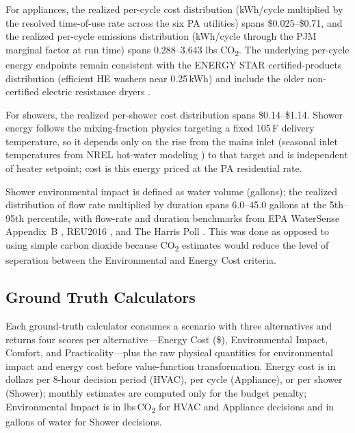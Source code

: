 \documentclass[final,3p,times]{elsarticle}
\begin{document}
For appliances, the realized per-cycle cost distribution (kWh/cycle multiplied by the resolved time-of-use rate across the six PA utilities) spans \$0.025--\$0.71, and the realized per-cycle emissions distribution (kWh/cycle through the PJM marginal factor at run time) spans 0.288--3.643 lbs CO\textsubscript{2}. The underlying per-cycle energy endpoints remain consistent with the ENERGY STAR certified-products distribution (efficient HE washers near 0.25\,kWh) and include the older non-certified electric resistance dryers \cite{energystar_products,chenyu2018,hustvedt2013,neep2015,porras2020}.

For showers, the realized per-shower cost distribution spans \$0.14--\$1.14. Shower energy follows the mixing-fraction physics targeting a fixed 105\,\textdegree{}F delivery temperature, so it depends only on the rise from the mains inlet (seasonal inlet temperatures from NREL hot-water modeling \cite{hendron2008}) to that target and is independent of heater setpoint; cost is this energy priced at the PA residential rate. 

Shower environmental impact is defined as water volume (gallons); the realized distribution of flow rate multiplied by duration spans 6.0--45.0 gallons at the 5th--95th percentile, with flow-rate and duration benchmarks from EPA WaterSense Appendix~B \cite{epawatersense}, REU2016 \cite{reu2016}, and The Harris Poll \cite{harrispoll2024}. This was done as opposed to using simple carbon dioxide because CO\textsubscript{2} estimates would reduce the level of seperation between the Environmental and Energy Cost criteria. 

\subsection{Ground Truth Calculators}
\label{sec:gt-calculators}
Each ground-truth calculator consumes a scenario with three alternatives and returns four scores per alternative---Energy Cost (\$), Environmental Impact, Comfort, and Practicality---plus the raw physical quantities for environmental impact and energy cost before value-function transformation. Energy cost is in dollars per 8-hour decision period (HVAC), per cycle (Appliance), or per shower (Shower); monthly estimates are computed only for the budget penalty; Environmental Impact is in lbs\,CO\textsubscript{2} for HVAC and Appliance decisions and in gallons of water for Shower decisions.
\end{document}
